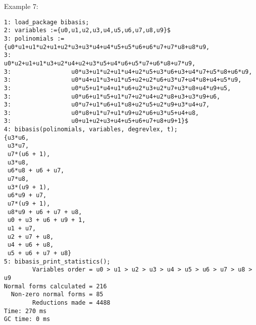 \noindent Example 7:
\begin{verbatim}
1: load_package bibasis;
2: variables :={u0,u1,u2,u3,u4,u5,u6,u7,u8,u9}$
3: polinomials := {u0*u1+u1*u2+u1+u2*u3+u3*u4+u4*u5+u5*u6+u6*u7+u7*u8+u8*u9,
3:                 u0*u2+u1+u1*u3+u2*u4+u2+u3*u5+u4*u6+u5*u7+u6*u8+u7*u9,
3:                 u0*u3+u1*u2+u1*u4+u2*u5+u3*u6+u3+u4*u7+u5*u8+u6*u9,
3:                 u0*u4+u1*u3+u1*u5+u2+u2*u6+u3*u7+u4*u8+u4+u5*u9,
3:                 u0*u5+u1*u4+u1*u6+u2*u3+u2*u7+u3*u8+u4*u9+u5,
3:                 u0*u6+u1*u5+u1*u7+u2*u4+u2*u8+u3+u3*u9+u6,
3:                 u0*u7+u1*u6+u1*u8+u2*u5+u2*u9+u3*u4+u7,
3:                 u0*u8+u1*u7+u1*u9+u2*u6+u3*u5+u4+u8,
3:                 u0+u1+u2+u3+u4+u5+u6+u7+u8+u9+1}$
4: bibasis(polinomials, variables, degrevlex, t);
{u3*u6,
 u3*u7,
 u7*(u6 + 1),
 u3*u8,
 u6*u8 + u6 + u7,
 u7*u8,
 u3*(u9 + 1),
 u6*u9 + u7,
 u7*(u9 + 1),
 u8*u9 + u6 + u7 + u8,
 u0 + u3 + u6 + u9 + 1,
 u1 + u7,
 u2 + u7 + u8,
 u4 + u6 + u8,
 u5 + u6 + u7 + u8}
5: bibasis_print_statistics();
        Variables order = u0 > u1 > u2 > u3 > u4 > u5 > u6 > u7 > u8 > u9
Normal forms calculated = 216
  Non-zero normal forms = 85
        Reductions made = 4488
Time: 270 ms
GC time: 0 ms
\end{verbatim}
